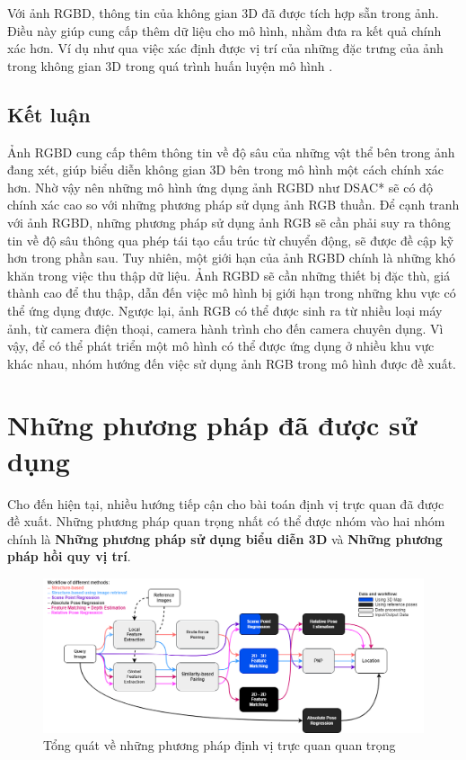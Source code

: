 Với ảnh RGBD, thông tin của không gian 3D đã được tích hợp sẵn trong ảnh. Điều này giúp cung cấp thêm dữ liệu cho mô hình, nhằm đưa ra kết quả chính xác hơn. Ví dụ như qua việc xác định được vị trí của những đặc trưng của ảnh trong không gian 3D trong quá trình huấn luyện mô hình \cite{brachmann2021visual,arnold2022mapfree}.


\subsection{Kết luận}
Ảnh RGBD cung cấp thêm thông tin về độ sâu của những vật thể bên trong ảnh đang xét, giúp biểu diễn không gian 3D bên trong mô hình một cách chính xác hơn. Nhờ vậy nên những mô hình ứng dụng ảnh RGBD như DSAC* \cite{brachmann2021visual} sẽ có độ chính xác cao so với những phương pháp sử dụng ảnh RGB thuần. Để cạnh tranh với ảnh RGBD, những phương pháp sử dụng ảnh RGB sẽ cần phải suy ra thông tin về độ sâu thông qua phép tái tạo cấu trúc từ chuyển động, sẽ được đề cập kỹ hơn trong phần sau. Tuy nhiên, một giới hạn của ảnh RGBD chính là những khó khăn trong việc thu thập dữ liệu. Ảnh RGBD sẽ cần những thiết bị đặc thù, giá thành cao để thu thập, dẫn đến việc mô hình bị giới hạn trong những khu vực có thể ứng dụng được. Ngược lại, ảnh RGB có thể được sinh ra từ nhiều loại máy ảnh, từ camera điện thoại, camera hành trình cho đến camera chuyên dụng. Vì vậy, để có thể phát triển một mô hình có thể được ứng dụng ở nhiều khu vực khác nhau, nhóm hướng đến việc sử dụng ảnh RGB trong mô hình được đề xuất.
\section{Những phương pháp đã được sử dụng}

Cho đến hiện tại, nhiều hướng tiếp cận cho bài toán định vị trực quan đã được đề xuất. Những phương pháp quan trọng nhất có thể được nhóm vào hai nhóm chính là \textbf{Những phương pháp sử dụng biểu diễn 3D} và \textbf{Những phương pháp hồi quy vị trí}.

\begin{figure}[H]
    \centering
    \includegraphics[width=\textwidth]{pics/Chapter2/overviewViLoc.png}
    \caption{Tổng quát về những phương pháp định vị trực quan quan trọng \cite{methodsLocal}}
\end{figure}

